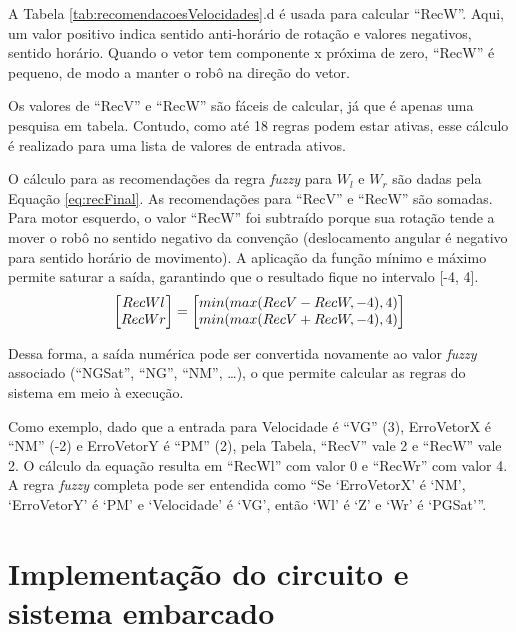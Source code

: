 	A Tabela \ref{tab:recomendacoesVelocidades}.d é usada para calcular ``RecW''. Aqui, um valor
	positivo indica sentido anti-horário de rotação e valores negativos, sentido horário. Quando
	o vetor tem componente x próxima de zero, ``RecW'' é pequeno, de modo a manter o robô na
	direção do vetor.
	
	Os valores de ``RecV'' e ``RecW'' são fáceis de calcular, já que é apenas uma pesquisa em 
	tabela. Contudo, como até 18 regras podem estar ativas, esse cálculo é realizado para uma 
	lista de valores de entrada ativos. 
	
	O cálculo para as recomendações da regra \textit{fuzzy} para $W_l$ e $W_r$ são dadas 
	pela Equação \ref{eq:recFinal}. As recomendações para ``RecV'' e ``RecW'' são somadas. Para
	motor esquerdo, o valor ``RecW'' foi subtraído porque sua rotação tende a mover o robô no 
	sentido negativo da convenção (deslocamento angular é negativo para sentido horário de 
	movimento). A aplicação da função mínimo e máximo permite saturar a saída, garantindo que 
	o resultado fique no intervalo [-4, 4]. 
	\begin{equation}
		\label{eq:recFinal}
			\mleft[
			\begin{matrix}
		  		RecWl\\
		  		RecWr\\
			\end{matrix}
			\mright] = \mleft[
			\begin{matrix}
		  		min(max(RecV - RecW,-4),4) \\
		  		min(max(RecV + RecW,-4),4) \\
			\end{matrix}
			\mright]
	\end{equation}
	
	Dessa forma, a saída numérica pode ser convertida novamente ao valor \textit{fuzzy} 
	associado (``NGSat'', ``NG'', ``NM'', \dots), o que permite calcular as regras do sistema
	em meio à execução.
	
	Como exemplo, dado que a entrada para Velocidade é ``VG'' (3), ErroVetorX é ``NM'' (-2) 
	e ErroVetorY é ``PM'' (2), pela Tabela, ``RecV'' vale 2 e ``RecW'' vale 2. O cálculo da
	equação resulta em ``RecWl'' com valor 0 e ``RecWr'' com valor 4. A regra \textit{fuzzy} completa
	pode ser entendida como ``Se `ErroVetorX' é `NM', `ErroVetorY' é `PM' e `Velocidade' é 
	`VG', então `Wl' é `Z' e `Wr' é `PGSat'''. 
	
\section{Implementação do circuito e sistema embarcado}

